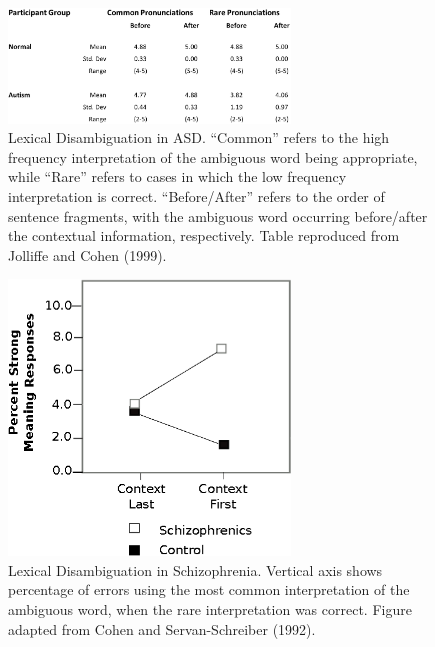 \begin{figure}[tp]
\begin{center}
	\includegraphics[width=75mm]{figures/asd_lexamb_study_results.eps}
\end{center}
\caption{Lexical Disambiguation in ASD. ``Common'' refers to the high frequency interpretation of the ambiguous word being appropriate, while ``Rare'' refers to cases in which the low frequency interpretation is correct. ``Before/After'' refers to the order of sentence fragments, with the ambiguous word occurring before/after the contextual information, respectively. Table reproduced from Jolliffe and Cohen (1999).}
\label{asd-lexamb-study}
\end{figure} 

\begin{figure}[tp]
\begin{center}
	\includegraphics[width=75mm]{figures/schiz_lexamb_study_results.eps}
\end{center}
\caption{Lexical Disambiguation in Schizophrenia. Vertical axis shows percentage of errors using the most common interpretation of the ambiguous word, when the rare interpretation was correct. Figure adapted from Cohen and Servan-Schreiber (1992).}
\label{schiz-lexamb-study}
\end{figure} 


